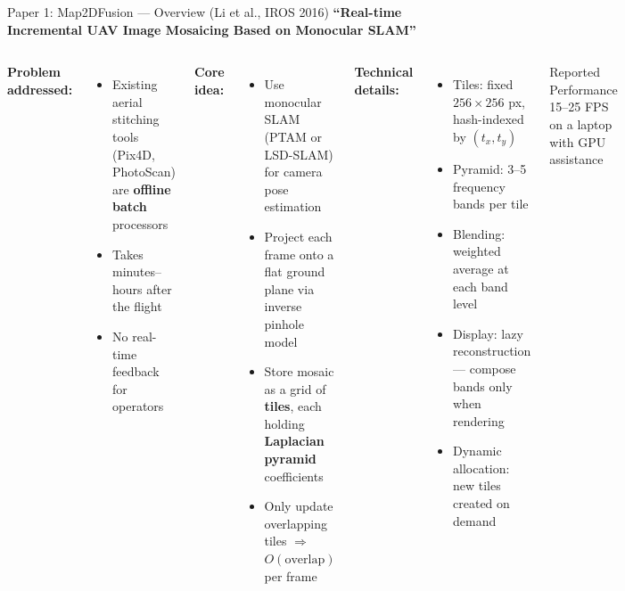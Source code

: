 \documentclass[aspectratio=169, 11pt]{beamer}
\begin{document}
\begin{frame}{Paper 1: Map2DFusion --- Overview (Li et al., IROS 2016)}
\small
\textbf{``Real-time Incremental UAV Image Mosaicing Based on Monocular SLAM''}

\begin{columns}[T]
\textbf{Problem addressed:}
\begin{itemize}
    \item Existing aerial stitching tools (Pix4D, PhotoScan) are \textbf{offline batch} processors
    \item Takes minutes--hours after the flight
    \item No real-time feedback for operators
\end{itemize}

\vspace{0.3em}
\textbf{Core idea:}
\begin{itemize}
    \item Use monocular SLAM (PTAM or LSD-SLAM) for camera pose estimation
    \item Project each frame onto a flat ground plane via inverse pinhole model
    \item Store mosaic as a grid of \textbf{tiles}, each holding \textbf{Laplacian pyramid} coefficients
    \item Only update overlapping tiles $\Rightarrow$ $O(\text{overlap})$ per frame
\end{itemize}

\textbf{Technical details:}
\begin{itemize}
    \item Tiles: fixed $256{\times}256$ px, hash-indexed by $(t_x, t_y)$
    \item Pyramid: 3--5 frequency bands per tile
    \item Blending: weighted average at each band level
    \item Display: lazy reconstruction --- compose bands only when rendering
    \item Dynamic allocation: new tiles created on demand
\end{itemize}

\vspace{0.3em}
\begin{block}{Reported Performance}
15--25 FPS on a laptop with GPU assistance
\end{block}
\end{columns}
\end{frame}
\end{document}
